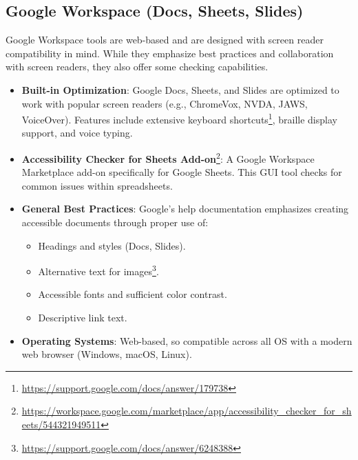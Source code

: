 \subsection{Google Workspace (Docs, Sheets, Slides)}
Google Workspace tools are web-based and are designed with screen reader compatibility in mind. While they emphasize best practices and collaboration with screen readers, they also offer some checking capabilities.
\begin{itemize}
    \item \textbf{Built-in Optimization}: Google Docs, Sheets, and Slides are optimized to work with popular screen readers (e.g., ChromeVox, NVDA, JAWS, VoiceOver). Features include extensive keyboard shortcuts\footnote{\url{https://support.google.com/docs/answer/179738}}, braille display support, and voice typing.
    \item \textbf{Accessibility Checker for Sheets Add-on}\footnote{\url{https://workspace.google.com/marketplace/app/accessibility_checker_for_sheets/544321949511}}: A Google Workspace Marketplace add-on specifically for Google Sheets. This GUI tool checks for common issues within spreadsheets.
    \item \textbf{General Best Practices}: Google's help documentation emphasizes creating accessible documents through proper use of:
        \begin{itemize}
            \item Headings and styles (Docs, Slides).
            \item Alternative text for images\footnote{\url{https://support.google.com/docs/answer/6248388}}.
            \item Accessible fonts and sufficient color contrast.
            \item Descriptive link text.
        \end{itemize}
    \item \textbf{Operating Systems}: Web-based, so compatible across all OS with a modern web browser (Windows, macOS, Linux).
\end{itemize}


